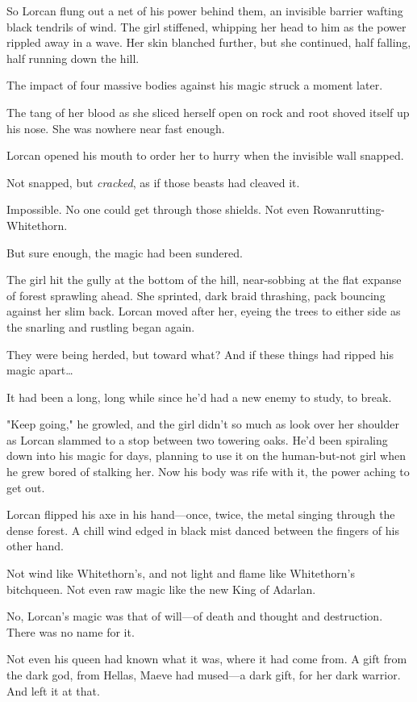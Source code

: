 So Lorcan flung out a net of his power behind them, an invisible barrier wafting black tendrils of wind. The girl stiffened, whipping her head to him as the power rippled away in a wave. Her skin blanched further, but she continued, half falling, half running down the hill.

The impact of four massive bodies against his magic struck a moment later.

The tang of her blood as she sliced herself open on rock and root shoved itself up his nose. She was nowhere near fast enough.

Lorcan opened his mouth to order her to hurry when the invisible wall snapped.

Not snapped, but \emph{cracked}, as if those beasts had cleaved it.

Impossible. No one could get through those shields. Not even Rowanrutting-Whitethorn.

But sure enough, the magic had been sundered.

The girl hit the gully at the bottom of the hill, near-sobbing at the flat expanse of forest sprawling ahead. She sprinted, dark braid thrashing, pack bouncing against her slim back. Lorcan moved after her, eyeing the trees to either side as the snarling and rustling began again.

They were being herded, but toward what? And if these things had ripped his magic apart\ldots{}

It had been a long, long while since he'd had a new enemy to study, to break.

"Keep going," he growled, and the girl didn't so much as look over her shoulder as Lorcan slammed to a stop between two towering oaks. He'd been spiraling down into his magic for days, planning to use it on the human-but-not girl when he grew bored of stalking her. Now his body was rife with it, the power aching to get out.

Lorcan flipped his axe in his hand---once, twice, the metal singing through the dense forest. A chill wind edged in black mist danced between the fingers of his other hand.

Not wind like Whitethorn's, and not light and flame like Whitethorn's bitchqueen. Not even raw magic like the new King of Adarlan.

No, Lorcan's magic was that of will---of death and thought and destruction. There was no name for it.

Not even his queen had known what it was, where it had come from. A gift from the dark god, from Hellas, Maeve had mused---a dark gift, for her dark warrior. And left it at that.

